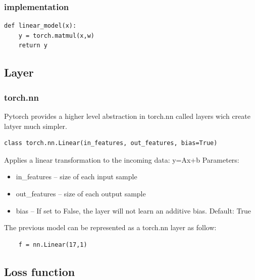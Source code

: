 \subsubsection{implementation}
\begin{lstlisting}
def linear_model(x):
    y = torch.matmul(x,w)
    return y
\end{lstlisting}

\subsection{Layer}
\subsubsection{torch.nn}
Pytorch provides a higher level abstraction in torch.nn called layers wich create latyer much simpler.
\begin{lstlisting}
class torch.nn.Linear(in_features, out_features, bias=True)
\end{lstlisting}
Applies a linear transformation to the incoming data: y=Ax+b
\newline Parameters:	
\begin{itemize}
    \item in\_features – size of each input sample
    \item out\_features – size of each output sample
    \item bias – If set to False, the layer will not learn an additive bias. Default: True
\end{itemize}

\noindent The previous model can be represented as a torch.nn layer as follow:
    \begin{lstlisting}
    f = nn.Linear(17,1) 
    \end{lstlisting}

\subsection{Loss function}
